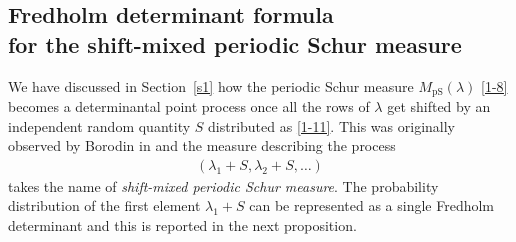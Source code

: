 \documentclass[pdftex]{sigma}
\numberwithin{equation}{section}
\def\l{\lambda}
\begin{document}
\subsection[Fredholm determinant formula for the shift-mixed periodic Schur measure]{Fredholm determinant formula \\
for the shift-mixed periodic Schur measure}\label{s22}

We have discussed in Section~\ref{s1} how the periodic Schur measure $M_{\text{pS}}(\l)$ \eqref{1-8} becomes a determinantal point process once all the rows of $\lambda$ get shifted by an independent random quantity $S$ distributed as \eqref{1-11}. This was originally observed by Borodin in \cite{Borodin2007PeriodicSchur} and the measure describing the process
\begin{align}
\label{216}
(\l_1+S,\l_2+S,\dots)
\end{align}
takes the name of \emph{shift-mixed periodic Schur measure}. The probability distribution of the first element $\l_1+S$ can be represented as a single Fredholm determinant and this is reported in the next proposition.

\end{document}
